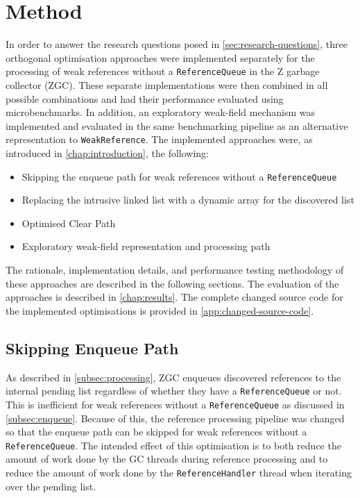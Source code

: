 \chapter{Method}
\label{chap:method}

In order to answer the research questions posed in \cref{sec:research-questions}, three orthogonal optimisation approaches were implemented separately for the processing of weak references without a \texttt{ReferenceQueue} in the Z garbage collector (ZGC). These separate implementations were then combined in all possible combinations and had their performance evaluated using microbenchmarks. In addition, an exploratory weak-field mechanism was implemented and evaluated in the same benchmarking pipeline as an alternative representation to \texttt{WeakReference}. The implemented approaches were, as introduced in \cref{chap:introduction}, the following:
\begin{itemize}
    \item Skipping the enqueue path for weak references without a \texttt{ReferenceQueue}
    \item Replacing the intrusive linked list with a dynamic array for the discovered list
    \item Optimised Clear Path
    \item Exploratory weak-field representation and processing path
\end{itemize}
The rationale, implementation details, and performance testing methodology of these approaches are described in the following sections. The evaluation of the approaches is described in \cref{chap:results}.
The complete changed source code for the implemented optimisations is provided in \cref{app:changed-source-code}.

\section{Skipping Enqueue Path}
\label{sec:skipping-enqueue-path}
As described in \cref{subsec:processing}, ZGC enqueues discovered references to the internal pending list regardless of whether they have a \texttt{ReferenceQueue} or not. This is inefficient for weak references without a \texttt{ReferenceQueue} as discussed in \cref{subsec:enqueue}. Because of this, the reference processing pipeline was changed so that the enqueue path can be skipped for weak references without a \texttt{ReferenceQueue}. The intended effect of this optimisation is to both reduce the amount of work done by the GC threads during reference processing and to reduce the amount of work done by the \texttt{ReferenceHandler} thread when iterating over the pending list.

